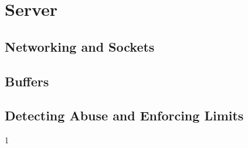 \section{Server}

\subsection{Networking and Sockets}

\subsection{Buffers}

\subsection{Detecting Abuse and Enforcing Limits}
1
